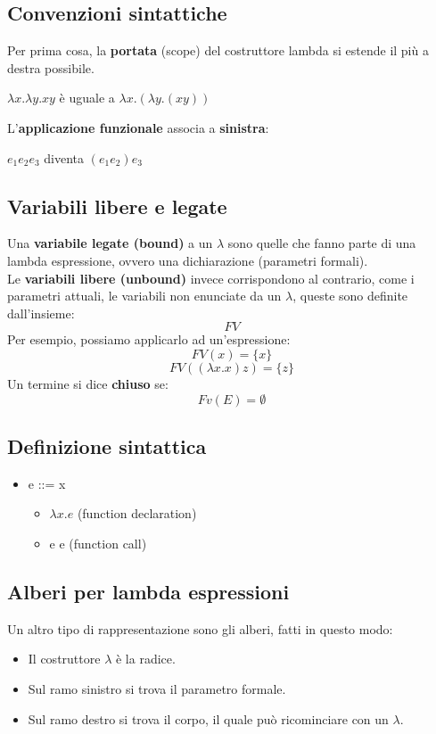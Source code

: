 \documentclass[12pt,a4paper]{article}
\begin{document}
\subsection{Convenzioni sintattiche}
Per prima cosa, la \textbf{portata} (scope) del costruttore lambda si estende il più a destra possibile.
\begin{center}
  $\lambda x.\lambda y.x y$ è uguale a $\lambda x.(\lambda y.(x y))$
\end{center}
L'\textbf{applicazione funzionale} associa a \textbf{sinistra}:
\begin{center}
  $e_1 e_2 e_3$ diventa $(e_1 e_2)e_3$
\end{center}
\subsection{Variabili libere e legate}
Una \textbf{variabile legate (bound)} a un $\lambda$ sono quelle che fanno parte di una lambda espressione, ovvero una dichiarazione (parametri formali).\\
Le \textbf{variabili libere (unbound)} invece corrispondono al contrario, come i parametri attuali, le variabili non enunciate da un $\lambda$, queste sono definite dall'insieme:
\[
FV
\]
Per esempio, possiamo applicarlo ad un'espressione:
\[
FV(x) = \{x\}
\]
\[
FV((\lambda x.x)z) = \{z\}
\]
Un termine si dice \textbf{chiuso} se:
\[
Fv(E) = \emptyset
\]
\subsection{Definizione sintattica}
\begin{itemize}
\item e ::= x
  \begin{itemize}
    \item $\lambda x.e$ (function declaration)
    \item e e           (function call)
  \end{itemize}
\end{itemize}
\subsection{Alberi per lambda espressioni}
Un altro tipo di rappresentazione sono gli alberi, fatti in questo modo:
\begin{itemize}
  \item Il costruttore $\lambda$ è la radice.
  \item Sul ramo sinistro si trova il parametro formale.
  \item Sul ramo destro si trova il corpo, il quale può ricominciare con un $\lambda$.
\end{itemize}
\end{document}
